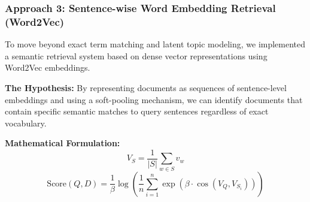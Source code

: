 \subsubsection{Approach 3: Sentence-wise Word Embedding Retrieval (Word2Vec)}
To move beyond exact term matching and latent topic modeling, we implemented a semantic retrieval system based on dense vector representations using Word2Vec embeddings.

\textbf{The Hypothesis:} By representing documents as sequences of sentence-level embeddings and using a soft-pooling mechanism, we can identify documents that contain specific semantic matches to query sentences regardless of exact vocabulary.

\textbf{Mathematical Formulation:}
\[
V_S = \frac{1}{|S|} \sum_{w \in S} v_w
\]
\[
\text{Score}(Q, D) = \frac{1}{\beta} \log \left( \frac{1}{n} \sum_{i=1}^{n} \exp(\beta \cdot \cos(V_Q, V_{S_i})) \right)
\]

